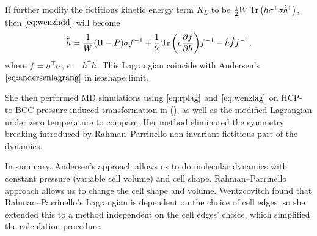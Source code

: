 If further modify the fictitious kinetic energy term $K_L$ to be
$ \frac{ 1 }{ 2 } W \Tr \big( \dot{ h } \sigma^{\mkern-1.5mu\mathsf{T}} \sigma \dot{ h }^{\mkern-1.5mu\mathsf{T}} \big)$,
then $\eqref{eq:wenzhdd}$ will become
\begin{equation}\label{eq:wenzhdd2}
	\ddot{h} = \frac{ 1 }{ W } (\Pi - P) \sigma f^{-1} + \frac{ 1 }{ 2 }
	\Tr \bigg( e \frac{ \partial f }{ \partial h } \bigg) f^{-1}
	- \dot{h} \dot{ f } f^{-1},
\end{equation}
where $f = \sigma ^{\mkern-1.5mu\mathsf{T}} \sigma$, $e = \dot{ h }^{\mkern-1.5mu\mathsf{T}} \dot{ h }$. This
Lagrangian coincide with Andersen's $\eqref{eq:andersenlagrang}$ in
isoshape limit.

She then performed MD simulations using $\eqref{eq:rplag}$ and
$\eqref{eq:wenzlag}$ on HCP-to-BCC
pressure-induced transformation in  (\cite{Wentzcovitch:1994kc}), 
as well as the modified Lagrangian under zero
temperature to compare. Her method eliminated the symmetry breaking
introduced by Rahman--Parrinello non-invariant fictitious part of the dynamics.

In summary, Andersen's approach allows us to do molecular dynamics with constant
pressure (variable cell volume) and cell shape. Rahman--Parrinello approach allows us to change the cell shape
and volume. Wentzcovitch found that Rahman--Parrinello's Lagrangian is dependent
on the choice of cell edges, so she extended this to a method independent on
the cell edges' choice, which simplified the calculation procedure.
